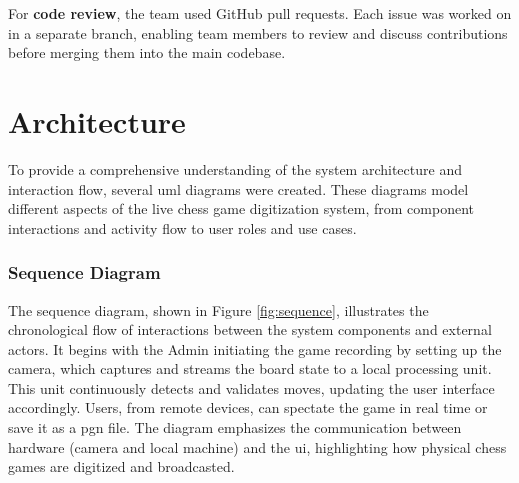 For \textbf{code review}, the team used GitHub pull requests. Each issue was worked on in a separate branch, enabling team members to review and discuss contributions before merging them into the main codebase.





\section{Architecture}
\label{subsec:diagrams}

To provide a comprehensive understanding of the system architecture and interaction flow, several \gls{uml} diagrams were created. These diagrams model different aspects of the live chess game digitization system, from component interactions and activity flow to user roles and use cases.

\subsubsection*{Sequence Diagram}
\label{subsubsec:sequence-diagram}

The sequence diagram, shown in Figure \ref{fig:sequence}, illustrates the chronological flow of interactions between the system components and external actors. It begins with the Admin initiating the game recording by setting up the camera, which captures and streams the board state to a local processing unit. This unit continuously detects and validates moves, updating the user interface accordingly. Users, from remote devices, can spectate the game in real time or save it as a \gls{pgn} file. The diagram emphasizes the communication between hardware (camera and local machine) and the \gls{ui}, highlighting how physical chess games are digitized and broadcasted.

\newpage

